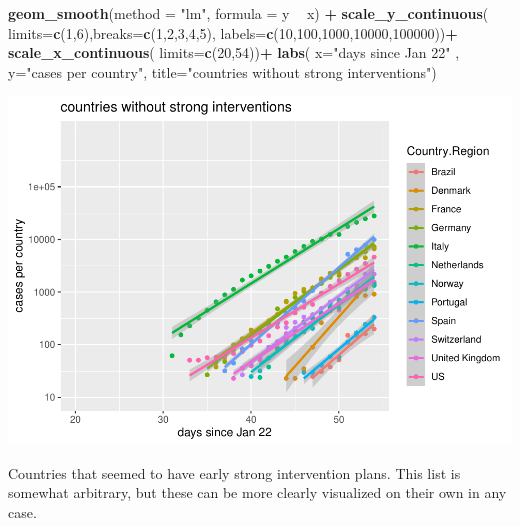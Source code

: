 \documentclass[]{article}
\newenvironment{Shaded}{\begin{snugshade}}{\end{snugshade}}
\newcommand{\DataTypeTok}[1]{\textcolor[rgb]{0.13,0.29,0.53}{#1}}
\newcommand{\DecValTok}[1]{\textcolor[rgb]{0.00,0.00,0.81}{#1}}
\newcommand{\KeywordTok}[1]{\textcolor[rgb]{0.13,0.29,0.53}{\textbf{#1}}}
\newcommand{\NormalTok}[1]{#1}
\newcommand{\OperatorTok}[1]{\textcolor[rgb]{0.81,0.36,0.00}{\textbf{#1}}}
\newcommand{\StringTok}[1]{\textcolor[rgb]{0.31,0.60,0.02}{#1}}
\begin{document}
\begin{Shaded}
\begin{Highlighting}[]
\StringTok{    }\KeywordTok{geom_smooth}\NormalTok{(}\DataTypeTok{method =} \StringTok{"lm"}\NormalTok{, }\DataTypeTok{formula =}\NormalTok{ y }\OperatorTok{~}\StringTok{ }\NormalTok{x) }\OperatorTok{+}\StringTok{ }
\StringTok{  }\KeywordTok{scale_y_continuous}\NormalTok{( }\DataTypeTok{limits=}\KeywordTok{c}\NormalTok{(}\DecValTok{1}\NormalTok{,}\DecValTok{6}\NormalTok{),}\DataTypeTok{breaks=}\KeywordTok{c}\NormalTok{(}\DecValTok{1}\NormalTok{,}\DecValTok{2}\NormalTok{,}\DecValTok{3}\NormalTok{,}\DecValTok{4}\NormalTok{,}\DecValTok{5}\NormalTok{), }\DataTypeTok{labels=}\KeywordTok{c}\NormalTok{(}\DecValTok{10}\NormalTok{,}\DecValTok{100}\NormalTok{,}\DecValTok{1000}\NormalTok{,}\DecValTok{10000}\NormalTok{,}\DecValTok{100000}\NormalTok{))}\OperatorTok{+}
\StringTok{  }\KeywordTok{scale_x_continuous}\NormalTok{( }\DataTypeTok{limits=}\KeywordTok{c}\NormalTok{(}\DecValTok{20}\NormalTok{,}\DecValTok{54}\NormalTok{))}\OperatorTok{+}
\StringTok{  }\KeywordTok{labs}\NormalTok{( }\DataTypeTok{x=}\StringTok{"days since Jan 22"}\NormalTok{ , }\DataTypeTok{y=}\StringTok{"cases per country"}\NormalTok{, }\DataTypeTok{title=}\StringTok{"countries without strong interventions"}\NormalTok{)}
\end{Highlighting}
\end{Shaded}

\includegraphics{PlotData_files/figure-latex/plotNIcountries-1.pdf}

Countries that seemed to have early strong intervention plans. This list
is somewhat arbitrary, but these can be more clearly visualized on their
own in any case.
\end{document}
